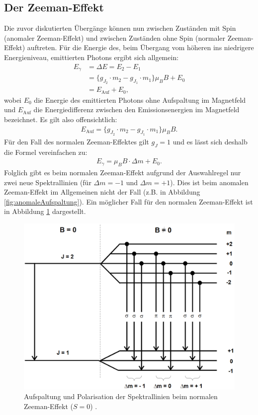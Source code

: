 \subsection{Der Zeeman-Effekt}
Die zuvor diskutierten Übergänge können nun zwischen Zuständen mit Spin (anomaler Zeeman-Effekt) und zwischen Zuständen ohne Spin (normaler Zeeman-Effekt) auftreten. Für die Energie des, beim Übergang vom höheren ins niedrigere Energieniveau, emittierten Photons ergibt sich allgemein:
\begin{equation} 
	\begin{split}
	E_\gamma &= \Delta E = E_2-E_1 \\
	&=\{g_{J_2} \cdot m_2-g_{J_1} \cdot m_1 \} \mu_B B  + E_0\\
	&=E_\text{Auf}+E_0,
	\end{split}
\end{equation}
wobei $E_0$ die Energie des emittierten Photons ohne Aufspaltung im Magnetfeld und $E_\text{Auf}$ die Energiedifferenz zwischen den Emissionsenergien im Magnetfeld bezeichnet. Es gilt also offensichtlich:
\begin{gather}
	E_\text{Auf}=\{g_{J_2} \cdot m_2-g_{J_1} \cdot m_1 \} \mu_B B . \label{eq:EAuf}
\end{gather}
Für den Fall des normalen Zeeman-Effektes gilt $g_{J}=1$ und es lässt sich deshalb die Formel vereinfachen zu:
\begin{align}
	E_\gamma = \mu_B B \cdot \Delta m +E_0.
\end{align}
Folglich gibt es beim normalen Zeeman-Effekt aufgrund der Auswahlregel nur zwei neue Spektrallinien (für $\Delta m = -1$ und $\Delta m = +1$). Dies ist beim anomalen Zeeman-Effekt im Allgemeinen nicht der Fall (z.B. in Abbildung \ref{fig:anomaleAufspaltung}). Ein möglicher Fall für den normalen Zeeman-Effekt ist in Abbildung \ref{fig:normaleAufspaltung} dargestellt.
\begin{figure}
	\centering
	\includegraphics[width=\linewidth-150pt,height=\textheight-150pt,keepaspectratio]{content/Images/normaleAufspaltung.png}
    \caption{Aufspaltung und Polarisation der Spektrallinien beim normalen Zeeman-Effekt ($S = 0$) \cite{V27}.}
    \label{fig:normaleAufspaltung}
\end{figure}
